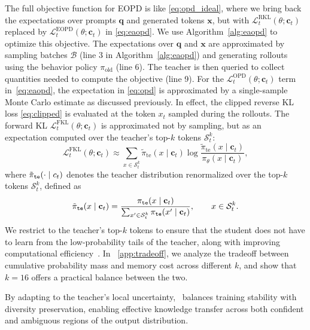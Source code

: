The full objective function for EOPD is like \eqref{eq:opd_ideal}, where we bring back the expectations over prompts $\mathbf{q}$ and generated tokens $\mathbf{x}$, but with $\mathcal{L}_t^{\text{RKL}}(\theta;\mathbf{c}_t)$ replaced by $\mathcal{L}_t^{\text{EOPD}}(\theta;\mathbf{c}_t)$ in \eqref{eq:eaopd}. 
We use Algorithm~\ref{alg:eaopd} to optimize this objective. 
The expectations over $\mathbf{q}$ and $\mathbf{x}$ are approximated by sampling batches $\mathcal{B}$ (line 3 in Algorithm~\ref{alg:eaopd}) and generating rollouts using the behavior policy $\pi_{\text{old}}$ (line 6). 
The teacher is then queried to collect quantities needed to compute the objective (line 9). 
For the $\mathcal{L}^{\text{OPD}}_t (\theta; \mathbf{c}_t)$ term in~\eqref{eq:eaopd}, the expectation in \eqref{eq:opd} is approximated by a single-sample Monte Carlo estimate as discussed previously. In effect, the clipped reverse KL loss \eqref{eq:clipped} is evaluated at the token $x_t$ sampled during the rollouts. 
The forward KL $\mathcal{L}^{\text{FKL}}_t(\theta; \mathbf{c}_t)$ is approximated not by sampling, but as an expectation computed over the teacher's top-$k$ tokens $\mathcal{S}_t^k$:
\begin{equation}
\label{eq:fkl}
\mathcal{L}^{\text{FKL}}_t (\theta;\mathbf{c}_t)
\approx
\sum_{x \in \mathcal{S}_t^k}
\tilde\pi_{\text{te}}(x \mid \mathbf{c}_t) 
\log \frac{\tilde\pi_{\text{te}}(x \mid \mathbf{c}_t)}{\pi_\theta(x \mid \mathbf{c}_t)},
\end{equation}
where $\tilde{\pi}_{\tt te}(\cdot\mid c_t)$ denotes the teacher distribution renormalized over the top-$k$ tokens $\mathcal{S}_t^k$, defined as
\[
\tilde{\pi}_{\tt te}(x\mid \mathbf{c}_t)
=
\frac{\pi_{\tt te}(x\mid \mathbf{c}_t)}
{\sum_{x'\in \mathcal{S}_t^k}\pi_{\tt te}(x'\mid \mathbf{c}_t)},
\qquad x\in \mathcal{S}_t^k.
\]
We restrict to the teacher's top-$k$ tokens to ensure that the student does not have to learn from the low-probability tails of the teacher, along with improving computational efficiency~\cite{shum2024first, peng2025pre}. {In ~\autoref{app:tradeoff}, we analyze the tradeoff between cumulative probability mass and memory cost across different $k$, and show that $k=16$ offers a practical balance between the two.}



By adapting to the teacher's local uncertainty, \method~balances training stability with diversity preservation, enabling effective knowledge transfer across both confident and ambiguous regions of the output distribution.
